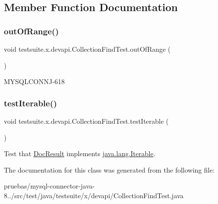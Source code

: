 \subsection{Member Function Documentation}
\mbox{\label{classtestsuite_1_1x_1_1devapi_1_1_collection_find_test_a49cb1ae2846f450d2e1ad6dc08372fdb}} 
\subsubsection{\texorpdfstring{out\+Of\+Range()}{outOfRange()}}
{\footnotesize\ttfamily void testsuite.\+x.\+devapi.\+Collection\+Find\+Test.\+out\+Of\+Range (\begin{DoxyParamCaption}{ }\end{DoxyParamCaption})}

M\+Y\+S\+Q\+L\+C\+O\+N\+N\+J-\/618 \mbox{\label{classtestsuite_1_1x_1_1devapi_1_1_collection_find_test_a0e7eb5b849d5f54c8130792209ba6614}} 
\subsubsection{\texorpdfstring{test\+Iterable()}{testIterable()}}
{\footnotesize\ttfamily void testsuite.\+x.\+devapi.\+Collection\+Find\+Test.\+test\+Iterable (\begin{DoxyParamCaption}{ }\end{DoxyParamCaption})}

Test that \mbox{\hyperlink{}{Doc\+Result}} implements \mbox{\hyperlink{}{java.\+lang.\+Iterable}}. 

The documentation for this class was generated from the following file\+:\begin{DoxyCompactItemize}
\item 
pruebas/mysql-\/connector-\/java-\/8../src/test/java/testsuite/x/devapi/Collection\+Find\+Test.\+java\end{DoxyCompactItemize}
